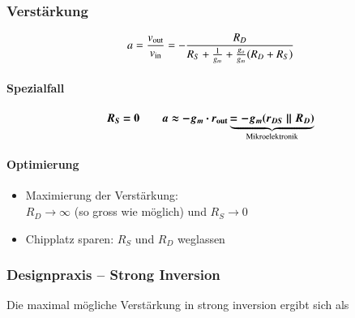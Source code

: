 \begin{minipage}[t]{0.58\columnwidth}
    \subsubsection{Verstärkung}

    \vspace{-0.2cm}
    \[
        a = \frac{v_{\rm out}}{v_{\rm in}} = - \frac{R_D}{R_S + \frac{1}{g_m} + \frac{g_o}{g_m}(R_D + R_S)} 
    \]


    \paragraph{Spezialfall}

    \vspace{-0.5cm}

    \[
        \boldsymbol{ R_S = 0 \qquad  a \approx - g_m \cdot r_{\rm out} \underbrace{= - g_m (r_{DS} \parallel R_D) }_{\text{Mikroelektronik}} }
    \]
    


    \vspace{-0.2cm}

    \paragraph{Optimierung}

    \begin{itemize}
        \item Maximierung der Verstärkung: \\
            $R_D \to \infty$ (so gross wie möglich) und $R_S \to 0$
        \item Chipplatz sparen: $R_S$ und $R_D$ weglassen
    \end{itemize}
\end{minipage}


\subsubsection{Designpraxis -- Strong Inversion}

Die \textbf{} maximal mögliche Verstärkung in strong inversion ergibt sich als

\vspace{-0.2cm}

